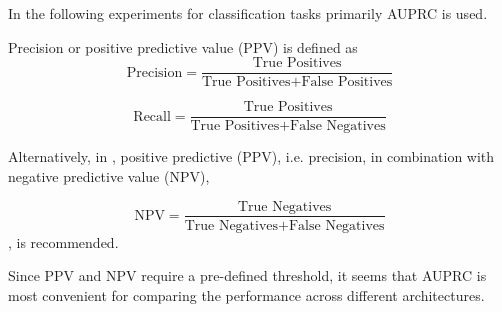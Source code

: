 In the following experiments for classification tasks primarily AUPRC is used.

Precision or positive predictive value (PPV) is defined as
\begin{equation}
\text{Precision} = \frac{\text{True Positives}}{\text{True Positives} + \text{False Positives}}
\end{equation}

\begin{equation}
\text{Recall} = \frac{\text{True Positives}}{\text{True Positives} + \text{False Negatives}}
\end{equation}

Alternatively, in \cite{Jiang.2021}, positive predictive (PPV), i.e. precision, in combination with negative predictive value (NPV),

\begin{equation}
\text{NPV} = \frac{\text{True Negatives}}{\text{True Negatives} + \text{False Negatives}}
\end{equation}
, is recommended.


Since PPV and NPV require a pre-defined threshold, it seems that AUPRC is most convenient for comparing the performance across different architectures.
